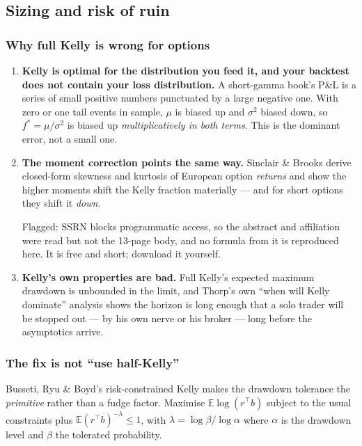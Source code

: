 \documentclass[11pt,a4paper]{article}
\newcommand{\srcnote}[1]{{\footnotesize\color{soft}#1\par}}
\begin{document}
\subsection{Sizing and risk of ruin}
\label{sec:sizing}

\subsubsection{Why full Kelly is wrong for options}

\begin{enumerate}
\item \textbf{Kelly is optimal for the distribution you feed it, and your backtest
does not contain your loss distribution.} A short-gamma book's P\&L is a series of
small positive numbers punctuated by a large negative one. With zero or one tail
events in sample, $\mu$ is biased up and $\sigma^2$ biased down, so
$f^{*} = \mu/\sigma^2$ is biased up \emph{multiplicatively in both terms}. This is
the dominant error, not a small one.
\item \textbf{The moment correction points the same way.} Sinclair \& Brooks derive
closed-form skewness and kurtosis of European option \emph{returns} and show the
higher moments shift the Kelly fraction materially --- and for short options they
shift it \emph{down}. \srcnote{Flagged: SSRN blocks programmatic access, so the
abstract and affiliation were read but not the 13-page body, and no formula from
it is reproduced here. It is free and short; download it yourself.}
\item \textbf{Kelly's own properties are bad.} Full Kelly's expected maximum
drawdown is unbounded in the limit, and Thorp's own ``when will Kelly dominate''
analysis shows the horizon is long enough that a solo trader will be stopped out
--- by his own nerve or his broker --- long before the asymptotics arrive.
\end{enumerate}

\subsubsection{The fix is not ``use half-Kelly''}

Busseti, Ryu \& Boyd's risk-constrained Kelly makes the drawdown tolerance the
\emph{primitive} rather than a fudge factor. Maximise $\mathbb{E}\log(r^\top b)$
subject to the usual constraints plus $\mathbb{E}(r^\top b)^{-\lambda} \le 1$, with
$\lambda = \log\beta / \log\alpha$ where $\alpha$ is the drawdown level and $\beta$
the tolerated probability.
\end{document}
